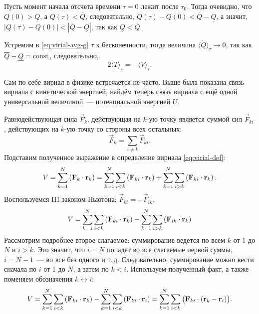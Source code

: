 Пусть момент начала отсчета времени $\tau = 0$ лежит после $\tau_0$. Тогда очевидно, что $Q(0) > \underline Q$, а $Q(\tau) < \overline Q$, следовательно, $Q(\tau) - Q(0) < \overline Q - \underline Q$, а значит, $|Q(\tau) - Q(0)| < |\overline Q - \underline Q|$, так как $\underline Q < \overline Q$. 

Устремим в \eqref{eq:virial-avg-g} $\tau$ к бесконечности, тогда величина $\langle \dot{Q} \rangle_\tau  \to 0$, так как $\overline Q - \underline Q = \operatorname{const}$, следовательно,
\begin{equation}
    2\langle T \rangle_\tau = - \langle V \rangle_{\tau}.
    \label{eq:virial-t-v}
\end{equation}

Сам по себе вириал в физике встречается не часто. Выше была показана связь вириала с кинетической энергией, найдём теперь связь вириала с ещё одной универсальной величиной~---  потенциальной энергией $U$.\,\cite{virial-theorem}

Равнодействующая сила $\vec F_k$, действующая на $k$-ую точку является суммой сил $\vec F_{ki}$, действующих на $k$-ую точку со стороны всех остальных:
\begin{equation*}
    \vec F_k = \sum_{i \not= k} \vec F_{ki}.
\end{equation*}
Подставим полученное выражение в определение вириала \eqref{eq:virial-def}:
\begin{equation*}
    V = \sum_{k = 1}^N \left(\mathbf{F}_k \cdot \mathbf{r}_k \right)
    = \sum_{k = 1}^N \sum_{i < k} \left(\mathbf{F}_{ki} \cdot \mathbf{r}_k \right)
    + \sum_{k = 1}^N \sum_{i > k} \left(\mathbf{F}_{ki} \cdot \mathbf{r}_k \right).
\end{equation*}
Воспользуемся III законом Ньютона: $\vec F_{ki} = - \vec F_{ik}$,
\begin{equation*}
    V = \sum_{k = 1}^N \sum_{i < k} \left(\mathbf{F}_{ki} \cdot \mathbf{r}_k \right)
    - \sum_{k = 1}^N \sum_{i > k} \left(\mathbf{F}_{ik} \cdot \mathbf{r}_k \right)
\end{equation*}
Рассмотрим подробнее второе слагаемое: суммирование ведется по всем $k$ от 1 до $N$ и $i > k$. Это значит, что $i = N$ попадет во все слагаемые первой суммы, $i = N - 1$~--- во все без одного и т.\,д. Следовательно, суммирование можно вести сначала по $i$ от 1 до $N$, а затем по $k < i$. Используем полученный факт, а также поменяем обозначения $k \leftrightarrow i$:
\begin{equation}
    V = \sum_{k = 1}^N \sum_{i < k} \left(\mathbf{F}_{ki} \cdot \mathbf{r}_k \right)
    - \sum_{k = 1}^N \sum_{i < k} \left(\mathbf{F}_{ki} \cdot \mathbf{r}_i \right)
    = \sum_{k = 1}^N \sum_{i < k} \big( \mathbf{F}_{ki} \cdot (\mathbf{r}_k - \mathbf{r}_i) \big).
    \label{eq:virial-v}
\end{equation}

